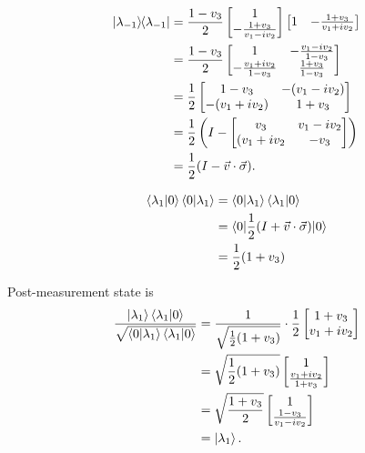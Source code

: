 \begin{align*}
	\ket{\lambda_{-1}}\hspace{-1mm} \bra{\lambda_{-1}} &= \frac{1 - v_3}{2} \begin{bmatrix}
	1 \\
	- \frac{1+v_3}{v_1 - iv_2}
	\end{bmatrix}
	\begin{bmatrix}
		1 & - \frac{1+v_3}{v_1 + iv_2}
	\end{bmatrix}\\
	&=
	\frac{1 - v_3}{2} \begin{bmatrix}
		1 & - \frac{v_1 - iv_2}{1 - v_3} \\
		- \frac{v_1 + iv_2}{1 - v_3} & \frac{1+v_3}{1 - v_3}
	\end{bmatrix} \\
	&=
	\frac{1}{2} \begin{bmatrix}
		1 - v_3 & -(v_1 - iv_2) \\
		- (v_1 + iv_2) & 1 + v_3
	\end{bmatrix} \\
	&=
	\frac{1}{2} \left( I - \begin{bmatrix}
		v_3 & v_1 - iv_2 \\
		(v_1 + iv_2 & - v_3
	\end{bmatrix} \right)\\
	&= \frac{1}{2} (I - \vec{v} \cdot \vec{\sigma} ).
\end{align*}



\begin{align*}
	\braket{\lambda_1 | 0} \braket{0 | \lambda_1} &= \braket{0 | \lambda_1} \braket{\lambda_1 | 0}\\
		&= \braket{0 | \frac{1}{2} ( I + \vec{v} \cdot \vec{\sigma} ) | 0}\\
		&= \frac{1}{2} (1 + v_3)
\end{align*}

Post-measurement state is
\begin{align*}
	\frac{\ket{\lambda_1} \braket{\lambda_1 | 0}}{ \sqrt{\braket{0 | \lambda_1} \braket{\lambda_1 | 0}} } &= \frac{1}{\sqrt{\frac{1}{2} (1 + v_3)}}
	\cdot \frac{1}{2}
	\begin{bmatrix}
		1 + v_3 \\
		v_1 + iv_2
	\end{bmatrix} \\
		&= \sqrt{ \frac{1}{2}  (1 + v_3) } \begin{bmatrix}
		1 \\
		\frac{v_1 + iv_2}{1+v_3}
		\end{bmatrix} \\
		&=  \sqrt{ \frac{1 + v_3}{2} } \begin{bmatrix}
		1 \\
		\frac{1 - v_3}{v_1 - iv_2}
		\end{bmatrix} \\
		&= \ket{\lambda_1}.
\end{align*}



